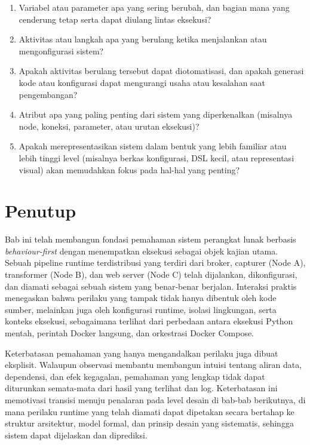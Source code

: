 \begin{enumerate}
  \item Variabel atau parameter apa yang sering berubah, dan bagian mana yang
        cenderung tetap serta dapat diulang lintas eksekusi?
  \item Aktivitas atau langkah apa yang berulang ketika menjalankan atau
        mengonfigurasi sistem?
  \item Apakah aktivitas berulang tersebut dapat diotomatisasi, dan apakah
        generasi kode atau konfigurasi dapat mengurangi usaha atau kesalahan saat
        pengembangan?
  \item Atribut apa yang paling penting dari sistem yang diperkenalkan (misalnya
        node, koneksi, parameter, atau urutan eksekusi)?
  \item Apakah merepresentasikan sistem dalam bentuk yang lebih familiar atau
        lebih tinggi level (misalnya berkas konfigurasi, DSL kecil, atau
        representasi visual) akan memudahkan fokus pada hal-hal yang penting?
\end{enumerate}

\section{Penutup}

Bab ini telah membangun fondasi pemahaman sistem perangkat lunak berbasis
\emph{behaviour-first} dengan menempatkan eksekusi sebagai objek kajian utama.
Sebuah pipeline runtime terdistribusi yang terdiri dari broker, capturer (Node A),
transformer (Node B), dan web server (Node C) telah dijalankan, dikonfigurasi,
dan diamati sebagai sebuah sistem yang benar-benar berjalan. Interaksi praktis
menegaskan bahwa perilaku yang tampak tidak hanya dibentuk oleh kode sumber,
melainkan juga oleh konfigurasi runtime, isolasi lingkungan, serta konteks
eksekusi, sebagaimana terlihat dari perbedaan antara eksekusi Python mentah,
perintah Docker langsung, dan orkestrasi Docker Compose.

Keterbatasan pemahaman yang hanya mengandalkan perilaku juga dibuat eksplisit.
Walaupun observasi membantu membangun intuisi tentang aliran data, dependensi,
dan efek kegagalan, pemahaman yang lengkap tidak dapat diturunkan semata-mata dari
hasil yang terlihat dan log. Keterbatasan ini memotivasi transisi menuju penalaran
pada level desain di bab-bab berikutnya, di mana perilaku runtime yang telah
diamati dapat dipetakan secara bertahap ke struktur arsitektur, model formal, dan
prinsip desain yang sistematis, sehingga sistem dapat dijelaskan dan diprediksi.

